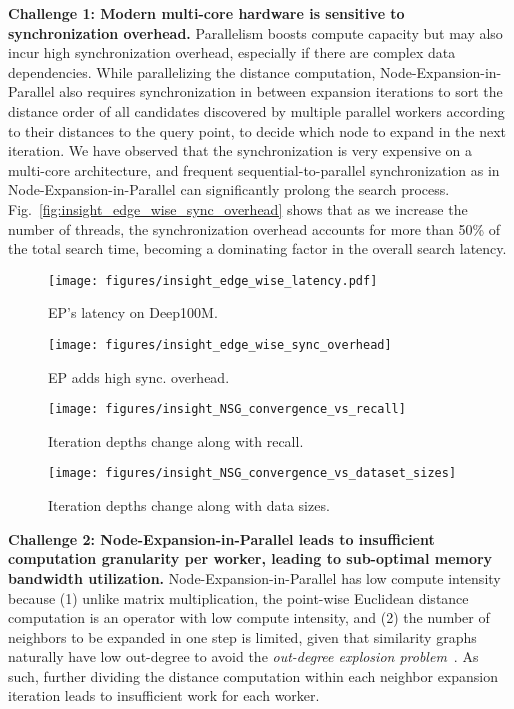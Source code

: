 \textbf{Challenge 1: Modern multi-core hardware is sensitive to synchronization overhead.}
Parallelism boosts compute capacity but may also incur high synchronization overhead, especially if there are complex data dependencies. While parallelizing the distance computation,  Node-Expansion-in-Parallel also requires synchronization in between expansion iterations to sort the distance order of all candidates discovered by multiple parallel workers according to their distances to the query point, to decide which node to expand in the next iteration. We have observed that the synchronization is very expensive on a multi-core architecture, and frequent sequential-to-parallel synchronization as in Node-Expansion-in-Parallel can significantly prolong the search process. 
Fig.~\ref{fig:insight_edge_wise_sync_overhead} shows that as we increase the number of threads, the synchronization overhead accounts for more than 50\%
of the total search time, becoming a dominating factor in the overall search latency. 

\begin{figure}[!ht]
\begin{minipage}[t]{0.23\textwidth}
    \centering
    \texttt{[image: figures/insight\_edge\_wise\_latency.pdf]}
    \caption{
        {EP's latency on Deep100M.}
    }
    \label{fig:insight_edge_wise_latency}
\end{minipage}
\hfill
\begin{minipage}[t]{0.23\textwidth}
    \centering
    \texttt{[image: figures/insight\_edge\_wise\_sync\_overhead]}
    \caption{
        {EP adds high sync. overhead.}
    }
    \label{fig:insight_edge_wise_sync_overhead}
\end{minipage}
\hfill
\begin{minipage}[t]{0.23\textwidth}
    \centering
    \texttt{[image: figures/insight\_NSG\_convergence\_vs\_recall]}
    \caption{
        {Iteration depths change along with recall.}
    }
    \label{fig:insight_NSG_convergence_vs_recall}
\end{minipage}
\hfill
\begin{minipage}[t]{0.23\textwidth}
    \centering
    \texttt{[image: figures/insight\_NSG\_convergence\_vs\_dataset\_sizes]}
    \caption{
        {Iteration depths change along with data sizes.}
    }
    \label{fig:insight_NSG_convergence_vs_dataset_sizes}
\end{minipage}
\end{figure}

\textbf{Challenge 2: Node-Expansion-in-Parallel leads to insufficient computation granularity per worker, leading to sub-optimal memory bandwidth utilization.} Node-Expansion-in-Parallel has low compute intensity because (1) unlike matrix multiplication, the point-wise Euclidean distance computation is an operator with low compute intensity, and (2) the number of neighbors to be expanded in one step is limited, given that similarity graphs naturally have low out-degree to avoid the \emph{out-degree explosion problem}~\cite{nsg}. As such, further dividing the distance computation within each neighbor expansion iteration leads to insufficient work for each worker. 

